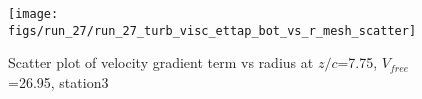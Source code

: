 \begin{figure}[H]
\centering
\texttt{[image: figs/run\_27/run\_27\_turb\_visc\_ettap\_bot\_vs\_r\_mesh\_scatter]}
\caption{Scatter plot of velocity gradient term vs radius at $z/c$=7.75, $V_{free}$=26.95, station3}
\label{fig:run_27_turb_visc_ettap_bot_vs_r_mesh_scatter}
\end{figure}



